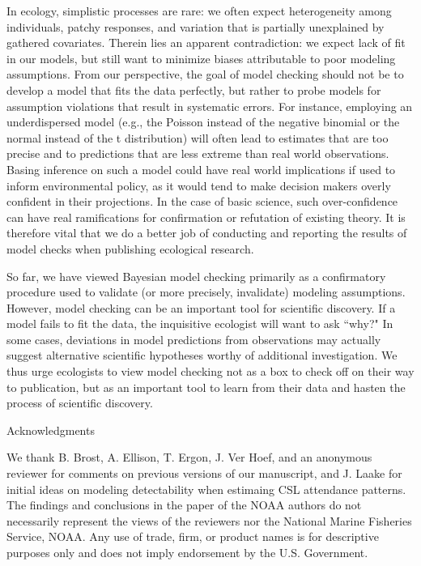 \documentclass[12pt,english]{article}
\begin{document}
\begin{spacing}{1.9}
In ecology, simplistic processes are rare: we often expect
heterogeneity among individuals, patchy responses, and variation that
is partially unexplained by gathered covariates.  Therein lies an
apparent contradiction: we expect lack of fit in our models, but still
want to minimize biases attributable to poor modeling assumptions.
From our perspective, the goal of model checking should not be to
develop a model that fits the data perfectly, but rather to probe
models for assumption violations that result in systematic errors.  For instance,
employing an underdispersed model (e.g., the Poisson instead of the negative
binomial or the normal instead of the t distribution) will often lead to estimates that
are too precise and to predictions that are less extreme than real world observations.
Basing inference on such a model could have real world implications if used
to inform environmental policy, as it would tend to make decision makers overly confident
in their projections.  In the case of basic science, such over-confidence can have
real ramifications for confirmation or refutation of existing theory. It is therefore vital that we do a better job
of conducting and reporting the results of model checks when
publishing ecological research.

So far, we have viewed Bayesian model checking primarily as a confirmatory procedure used to
validate (or more precisely, invalidate) modeling assumptions.  However, model checking
can be an important tool for scientific discovery.  If a model fails to fit the data, the inquisitive
ecologist will want to ask ``why?"  In some cases, deviations in model predictions from
observations may actually suggest alternative scientific
hypotheses worthy of additional investigation.  We thus urge ecologists to view model checking not as a box
to check off on their way to publication, but as an important tool to learn from their data
and hasten the process of scientific discovery.

\centerline{\sc Acknowledgments} We thank B. Brost,
A. Ellison, T. Ergon, J. Ver Hoef, and an anonymous reviewer for comments on
previous versions of our manuscript, and J. Laake for initial ideas
on modeling detectability when estimaing CSL attendance patterns.
The findings and conclusions in the paper of the NOAA authors do not necessarily represent the views of the
reviewers nor the National Marine Fisheries Service, NOAA.  Any use of trade, firm, or product names
is for descriptive purposes only and does not imply endorsement by the
U.S. Government.


\end{spacing}
\end{document}
